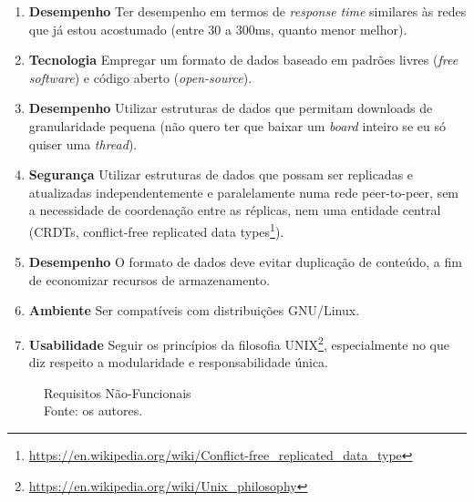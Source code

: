 \begin{enumerate}
    \item \textbf{Desempenho} Ter desempenho em termos de \textit{response time} similares às redes que já estou acostumado (entre 30 a 300ms, quanto menor melhor).
    \item \textbf{Tecnologia} Empregar um formato de dados baseado em padrões livres (\textit{free software}) e código aberto (\textit{open-source}).
    \item \textbf{Desempenho} Utilizar estruturas de dados que permitam downloads de granularidade pequena (não quero ter que baixar um \textit{board} inteiro se eu só quiser uma \textit{thread}).
    \item \textbf{Segurança} Utilizar estruturas de dados que possam ser replicadas e atualizadas independentemente e paralelamente numa rede peer-to-peer, sem a necessidade de coordenação entre as réplicas, nem uma entidade central (CRDTs, conflict-free replicated data types\footnote{\url{https://en.wikipedia.org/wiki/Conflict-free_replicated_data_type}}).
    \item \textbf{Desempenho} O formato de dados deve evitar duplicação de conteúdo, a fim de economizar recursos de armazenamento.
    \item \textbf{Ambiente} Ser compatíveis com distribuições GNU/Linux.
    \item \textbf{Usabilidade} Seguir os princípios da filosofia UNIX\footnote{\url{https://en.wikipedia.org/wiki/Unix_philosophy}}, especialmente no que diz respeito a modularidade e responsabilidade única.
\end{enumerate}

\begin{figure}[H]
    \centering
    
    \caption[Requisitos Não-Funcionais]{\label{fig:Requisitos_Nao_Funcionais}
        Requisitos Não-Funcionais\\
        Fonte: os autores.
    }
\end{figure}

